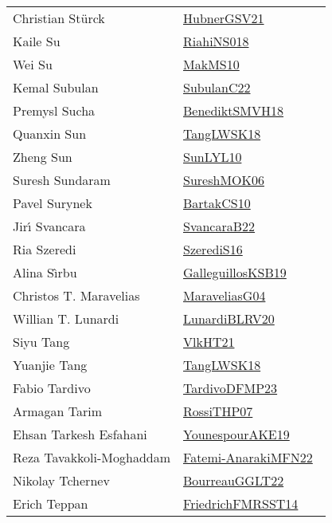 {\begin{longtable}{p{4cm}p{20cm}}
Christian St{\"{u}}rck & \href{works/HubnerGSV21.pdf}{HubnerGSV21}~\cite{HubnerGSV21}\\
Kaile Su & \href{works/RiahiNS018.pdf}{RiahiNS018}~\cite{RiahiNS018}\\
Wei Su & \href{works/MakMS10.pdf}{MakMS10}~\cite{MakMS10}\\
Kemal Subulan & \href{works/SubulanC22.pdf}{SubulanC22}~\cite{SubulanC22}\\
Premysl Sucha & \href{works/BenediktSMVH18.pdf}{BenediktSMVH18}~\cite{BenediktSMVH18}\\
Quanxin Sun & \href{works/TangLWSK18.pdf}{TangLWSK18}~\cite{TangLWSK18}\\
Zheng Sun & \href{works/SunLYL10.pdf}{SunLYL10}~\cite{SunLYL10}\\
Suresh Sundaram & \href{}{SureshMOK06}~\cite{SureshMOK06}\\
Pavel Surynek & \href{works/BartakCS10.pdf}{BartakCS10}~\cite{BartakCS10}\\
Jir{\'{\i}} Svancara & \href{}{SvancaraB22}~\cite{SvancaraB22}\\
Ria Szeredi & \href{works/SzerediS16.pdf}{SzerediS16}~\cite{SzerediS16}\\
Alina S{\^{\i}}rbu & \href{works/GalleguillosKSB19.pdf}{GalleguillosKSB19}~\cite{GalleguillosKSB19}\\
Christos T. Maravelias & \href{works/MaraveliasG04.pdf}{MaraveliasG04}~\cite{MaraveliasG04}\\
Willian T. Lunardi & \href{works/LunardiBLRV20.pdf}{LunardiBLRV20}~\cite{LunardiBLRV20}\\
Siyu Tang & \href{works/VlkHT21.pdf}{VlkHT21}~\cite{VlkHT21}\\
Yuanjie Tang & \href{works/TangLWSK18.pdf}{TangLWSK18}~\cite{TangLWSK18}\\
Fabio Tardivo & \href{works/TardivoDFMP23.pdf}{TardivoDFMP23}~\cite{TardivoDFMP23}\\
Armagan Tarim & \href{works/RossiTHP07.pdf}{RossiTHP07}~\cite{RossiTHP07}\\
Ehsan Tarkesh Esfahani & \href{works/YounespourAKE19.pdf}{YounespourAKE19}~\cite{YounespourAKE19}\\
Reza Tavakkoli-Moghaddam & \href{}{Fatemi-AnarakiMFN22}~\cite{Fatemi-AnarakiMFN22}\\
Nikolay Tchernev & \href{works/BourreauGGLT22.pdf}{BourreauGGLT22}~\cite{BourreauGGLT22}\\
Erich Teppan & \href{}{FriedrichFMRSST14}~\cite{FriedrichFMRSST14}\\

\end{longtable}}
